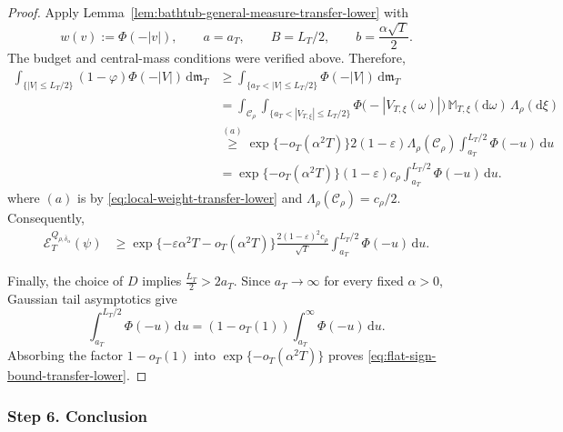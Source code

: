 \documentclass[10pt]{article}
\newcommand{\dd}{\mathrm{d}}
\theoremstyle{plain}
\begin{document}
\begin{proof}
Apply
Lemma~\ref{lem:bathtub-general-measure-transfer-lower} with
\[
    w(v):=\Phi(-|v|),
    \qquad
    a=a_T,
    \qquad
    B=L_T/2,
    \qquad
    b=\frac{\alpha\sqrt T}{2}.
\]
The budget and central-mass conditions were verified above. Therefore,
\[
\begin{aligned}
    \int_{\{|V|\le L_T/2\}}
        (1-\varphi)
        \Phi(-|V|)
    \,\dd\mathfrak m_T
    &\ge
    \int_{\{a_T<|V|\le L_T/2\}}
        \Phi(-|V|)
    \,\dd\mathfrak m_T\\
    &=
    \int_{\mathcal C_\rho}
    \int_{\{a_T<|V_{T,\xi}|\le L_T/2\}}
        \Phi\bigl(-|V_{T,\xi}(\omega)|\bigr)
    \,\mathbb M_{T,\xi}(\dd\omega)\,
    \Lambda_\rho(\dd\xi) \\
    &\stackrel{(a)}{\geq}
    \exp\{-o_T(\alpha^2T)\}
    2(1-\varepsilon)
    \Lambda_\rho(\mathcal C_\rho)
    \int_{a_T}^{L_T/2}
        \Phi(-u)
    \,\dd u\\
    &=
    \exp\{-o_T(\alpha^2T)\}
    (1-\varepsilon)c_\rho
    \int_{a_T}^{L_T/2}
        \Phi(-u)
    \,\dd u.
\end{aligned}
\]
where $(a)$ is by \eqref{eq:local-weight-transfer-lower} and
$\Lambda_\rho(\mathcal C_\rho)=c_\rho/2$.
Consequently,
\[
\begin{aligned}
    \mathcal E_T^{Q_{\rho,\bar\delta_\alpha}}(\psi)
    &\ge
    \exp\{
        -\varepsilon\alpha^2T
        -o_T(\alpha^2T)
    \}
    \frac{
        2(1-\varepsilon)^2c_\rho
    }{
        \sqrt T
    }
    \int_{a_T}^{L_T/2}
        \Phi(-u)
    \,\dd u.
\end{aligned}
\]

Finally, the choice of $D$ implies
    $\frac{L_T}{2}>2a_T$.
Since $a_T\to\infty$ for every fixed $\alpha>0$, Gaussian tail asymptotics
give
\[
    \int_{a_T}^{L_T/2}
        \Phi(-u)
    \,\dd u
    =
    (1-o_T(1))
    \int_{a_T}^{\infty}
        \Phi(-u)
    \,\dd u.
\]
Absorbing the factor $1-o_T(1)$ into
$\exp\{-o_T(\alpha^2T)\}$ proves
\eqref{eq:flat-sign-bound-transfer-lower}. 
\end{proof}








\subsubsection{Step 6. Conclusion}
\end{document}
